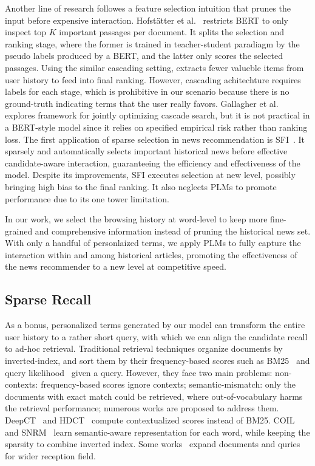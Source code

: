 \documentclass[sigconf,anonymous]{acmart}
\begin{document}
Another line of research followes a feature selection intuition that prunes the input before expensive interaction. Hofstätter et al.~\cite{Intra-Document-Cascading}
restricts BERT to only inspect top $K$ important passages per document. It splits the selection and ranking stage, where the former is trained in teacher-student paradiagm by the pseudo labels produced by a BERT, and the latter only scores the selected passages. Using the similar cascading setting, \citet{ali_SIM} extracts fewer valueble items from user history to feed into final ranking. However, cascading achitechture requires labels for each stage, which is prohibitive in our scenario because there is no ground-truth indicating terms that the user really favors. Gallagher et al.~\cite{gallagher_joint_cascade} explores framework for jointly optimizing cascade search, but it is not practical in a BERT-style model since it relies on specified empirical risk rather than ranking loss. The first application of sparse selection in news recommendation is SFI~\cite{zpt}. It sparsely and automatically selects important historical news before effective candidate-aware interaction, guaranteeing the efficiency and effectiveness of the model. Despite its improvements, SFI executes selection at new level, possibly bringing high bias to the final ranking. It also neglects PLMs to promote performance due to its one tower limitation.

In our work, we select the browsing history at word-level to keep more fine-grained and comprehensive information instead of pruning the historical news set. With only a handful of personlaized terms, we apply PLMs to fully capture the interaction within and among historical articles, promoting the effectiveness of the news recommender to a new level at competitive speed.

\subsection{Sparse Recall}
As a bonus, personalized terms generated by our model can transform the entire user history to a rather short query, with which we can align the candidate recall to ad-hoc retrieval. Traditional retrieval techniques organize documents by inverted-index, and sort them by their frequency-based scores such as BM25~\cite{BM25} and query likelihood~\cite{query_likelihood} given a query. However, they face two main problems: non-contexts: frequency-based scores ignore contexts; semantic-mismatch: only the documents with exact match could be retrieved, where out-of-vocabulary harms the retrieval performance; numerous works are proposed to address them. DeepCT~\cite{DeepCT} and HDCT~\cite{HDCT} compute contextualized scores instead of BM25. COIL~\cite{COIL} and SNRM~\cite{SNRM} learn semantic-aware representation for each word, while keeping the sparsity to combine inverted index. Some works~\cite{Doc2Query,SparTerm,DeepImpact} expand documents and quries for wider reception field.
\end{document}
